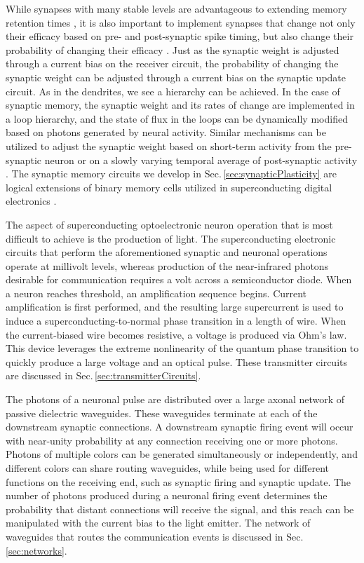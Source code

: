 \documentclass[aip,amsmath,amssymb,reprint,nofootinbib]{revtex4-1}
\begin{document}
While synapses with many stable levels are advantageous to extending memory retention times \cite{fuab2007}, it is also important to implement synapses that change not only their efficacy based on pre- and post-synaptic spike timing, but also change their probability of changing their efficacy \cite{fudr2005}. Just as the synaptic weight is adjusted through a current bias on the receiver circuit, the probability of changing the synaptic weight can be adjusted through a current bias on the synaptic update circuit. As in the dendrites, we see a hierarchy can be achieved. In the case of synaptic memory, the synaptic weight and its rates of change are implemented in a loop hierarchy, and the state of flux in the loops can be dynamically modified based on photons generated by neural activity. Similar mechanisms can be utilized to adjust the synaptic weight based on short-term activity from the pre-synaptic neuron \cite{abre2004} or on a slowly varying temporal average of post-synaptic activity \cite{bico1982,cobe2012}. The synaptic memory circuits we develop in Sec.\,\ref{sec:synapticPlasticity} are logical extensions of binary memory cells utilized in superconducting digital electronics \cite{vatu1998,ka1999}.

The aspect of superconducting optoelectronic neuron operation that is most difficult to achieve is the production of light. The superconducting electronic circuits that perform the aforementioned synaptic and neuronal operations operate at millivolt levels, whereas production of the near-infrared photons desirable for communication requires a volt across a semiconductor diode. When a neuron reaches threshold, an amplification sequence begins. Current amplification is first performed, and the resulting large supercurrent is used to induce a superconducting-to-normal phase transition in a length of wire. When the current-biased wire becomes resistive, a voltage is produced via Ohm's law. This device leverages the extreme nonlinearity of the quantum phase transition to quickly produce a large voltage and an optical pulse. These transmitter circuits are discussed in Sec.\,\ref{sec:transmitterCircuits}.

The photons of a neuronal pulse are distributed over a large axonal network of passive dielectric waveguides. These waveguides terminate at each of the downstream synaptic connections. A downstream synaptic firing event will occur with near-unity probability at any connection receiving one or more photons. Photons of multiple colors can be generated simultaneously or independently, and different colors can share routing waveguides, while being used for different functions on the receiving end, such as synaptic firing and synaptic update. The number of photons produced during a neuronal firing event determines the probability that distant connections will receive the signal, and this reach can be manipulated with the current bias to the light emitter. The network of waveguides that routes the communication events is discussed in Sec.\,\ref{sec:networks}.
\end{document}
